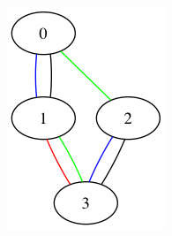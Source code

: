\begin{figure}[H]
  \centering
  \includegraphics[max width=\linewidth]{fig/2/patterns/similar1.png}
  \endminipage

\end{figure}
